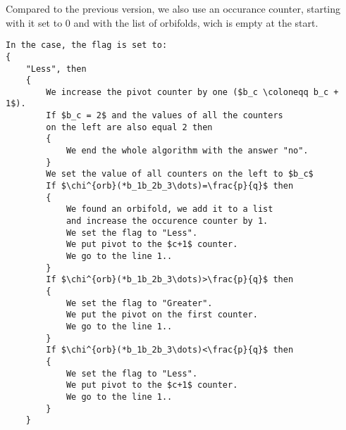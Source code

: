 Compared to the previous version, we also use an occurance counter, starting with it set to 0 
and with the list of orbifolds, wich is empty at the start.
\begin{lstlisting}[firstnumber=1,consecutivenumbers=true]
In the case, the flag is set to: 
{
    "Less", then 
    {
        We increase the pivot counter by one ($b_c \coloneqq b_c + 1$).
        If $b_c = 2$ and the values of all the counters 
        on the left are also equal 2 then 
        {
            We end the whole algorithm with the answer "no".
        }
        We set the value of all counters on the left to $b_c$
        If $\chi^{orb}(*b_1b_2b_3\dots)=\frac{p}{q}$ then
        {
            We found an orbifold, we add it to a list 
            and increase the occurence counter by 1. 
            We set the flag to "Less".
            We put pivot to the $c+1$ counter.
            We go to the line 1..
        }
        If $\chi^{orb}(*b_1b_2b_3\dots)>\frac{p}{q}$ then  
        {
            We set the flag to "Greater".
            We put the pivot on the first counter. 
            We go to the line 1..
        } 
        If $\chi^{orb}(*b_1b_2b_3\dots)<\frac{p}{q}$ then
        {
            We set the flag to "Less".
            We put pivot to the $c+1$ counter.
            We go to the line 1..
        } 
    }


\end{lstlisting}
